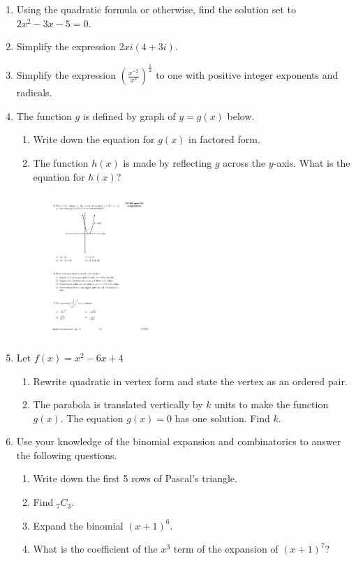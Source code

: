 \documentclass[12pt, oneside]{article}
\begin{document}
\begin{enumerate}
\item Using the quadratic formula or otherwise, find the solution set to $2x^2-3x-5=0$.

\item Simplify the expression $2xi(4+3i)$.

\item Simplify the expression $\displaystyle \left( \frac{x^{-2}}{x^2} \right)^{\frac{1}{2}}$ to one with positive integer exponents and radicals.

\newpage
\item The function $g$ is defined by graph of $y=g(x)$ below.
\begin{enumerate}
    \item Write down the equation for $g(x)$ in factored form.
    \item The function $h(x)$ is made by reflecting $g$ across the $y$-axis. What is the equation for $h(x)$?
\end{enumerate}

\begin{figure}[!ht]
    \centering
    \includegraphics[width=0.4\textwidth]{parabola-graphic.pdf}
\end{figure}

\item Let $f(x) = x^2-6x+4$
\begin{enumerate}
    \item Rewrite quadratic in vertex form and state the vertex as an ordered pair.
    \item The parabola is translated vertically by $k$ units to make the function $g(x)$. The equation $g(x)=0$ has one solution. Find $k$.
\end{enumerate}

\item Use your knowledge of the binomial expansion and combinatorics to answer the following questions.
\begin{enumerate}
    \item Write down the first 5 rows of Pascal's triangle.
    \item Find $_7C_3$.
    \item Expand the binomial $(x+1)^6$.
    \item What is the coefficient of the $x^3$ term of the expansion of $(x+1)^7$?
\end{enumerate}


\end{enumerate}
\end{document}
